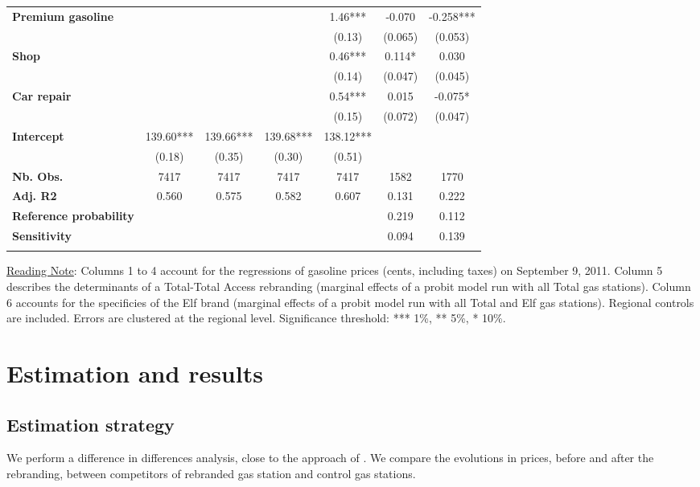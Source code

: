 \documentclass[english]{article}
\begin{document}
\begin{center}
\begin{footnotesize}
\begin{tabular}{l|cccccc}
\textbf{Premium gasoline}  &  &  &  & 1.46{*}{*}{*}  & -0.070  & -0.258{*}{*}{*}\tabularnewline
 &  &  &  & (0.13)  & (0.065)  & (0.053)\tabularnewline
\textbf{Shop}  &  &  &  & 0.46{*}{*}{*}  & 0.114{*}  & 0.030\tabularnewline
 &  &  &  & (0.14)  & (0.047)  & (0.045)\tabularnewline
\textbf{Car repair}  &  &  &  & 0.54{*}{*}{*}  & 0.015  & -0.075{*}\tabularnewline
 &  &  &  & (0.15)  & (0.072)  & (0.047)\tabularnewline
\hline
\textbf{Intercept}  & 139.60{*}{*}{*}  & 139.66{*}{*}{*}  & 139.68{*}{*}{*}  & 138.12{*}{*}{*}  &  & \tabularnewline
 & (0.18)  & (0.35)  & (0.30)  & (0.51)  &  & \tabularnewline
\hline
\textbf{Nb. Obs.}  & 7417  & 7417  & 7417  & 7417  & 1582  & 1770\tabularnewline
\textbf{Adj. R2}  & 0.560  & 0.575  & 0.582  & 0.607  & 0.131  & 0.222\tabularnewline
\textbf{Reference probability}  &  &  &  &  & 0.219  & 0.112\tabularnewline
\textbf{Sensitivity}  &  &  &  &  & 0.094  & 0.139\tabularnewline
\hline
\hline
\multicolumn{1}{l}{} &  &  &  &  &  & \tabularnewline
\end{tabular}\end{footnotesize}
\par\end{center}

{\small{}\uline{Reading Note}}{\small{}: } Columns 1 to 4 account for the regressions of gasoline prices (cents, including taxes) on September 9, 2011. Column 5 describes the determinants of a Total-Total Access rebranding (marginal effects of a probit model run with all Total gas stations). Column 6 accounts for the specificies of the Elf brand (marginal effects of a probit model run with all Total and Elf gas stations). Regional controls are included. Errors are clustered at the regional level. Significance threshold: {*}{*}{*} 1\%, {*}{*} 5\%, {*} 10\%.

\section{Estimation and results}

\subsection{Estimation strategy}

We perform a difference in differences analysis, close to the approach of \cite{HAS04}. We compare the evolutions in prices, before and after the rebranding, between competitors of rebranded gas station and control gas stations.\medskip{}
\end{document}
